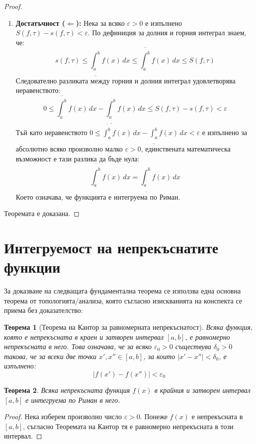 \documentclass{scrartcl}
\newtheorem{theorem}{Теорема}
\begin{document}
\begin{FlushLeft}
\begin{proof}
\begin{enumerate}
    \item \textbf{Достатъчност ($\Leftarrow$):}
    Нека за всяко $\varepsilon > 0$ е изпълнено $S(f, \tau) - s(f, \tau) < \varepsilon$. По дефиниция за долния и горния интеграл знаем, че:
    \[ s(f, \tau) \le \underline{\int_{a}^{b}} f(x)\,dx \le \overline{\int_{a}^{b}} f(x)\,dx \le S(f, \tau) \]
    Следователно разликата между горния и долния интеграл удовлетворява неравенството:
    \[ 0 \le \overline{\int_{a}^{b}} f(x)\,dx - \underline{\int_{a}^{b}} f(x)\,dx \le S(f, \tau) - s(f, \tau) < \varepsilon \]
    Тъй като неравенството $0 \le \overline{\int_{a}^{b}} f(x)\,dx - \underline{\int_{a}^{b}} f(x)\,dx < \varepsilon$ е изпълнено за абсолютно всяко произволно малко $\varepsilon > 0$, единствената математическа възможност е тази разлика да бъде нула:
    \[ \overline{\int_{a}^{b}} f(x)\,dx = \underline{\int_{a}^{b}} f(x)\,dx \]
    Което означава, че функцията е интегруема по Риман.
\end{enumerate}
Теоремата е доказана.
\end{proof}

\newpage

\section{Интегруемост на непрекъснатите функции}

За доказване на следващата фундаментална теорема се използва една основна теорема от топологията/анализа, която съгласно изискванията на конспекта се приема без доказателство:

\begin{theorem}[Теорема на Кантор за равномерната непрекъснатост]
Всяка функция, която е непрекъсната в краен и затворен интервал $[a, b]$, е равномерно непрекъсната в него. Това означава, че за всяко $\varepsilon_0 > 0$ съществува $\delta_0 > 0$ такова, че за всеки две точки $x', x'' \in [a, b]$, за които $|x' - x''| < \delta_0$, е изпълнено:
\[ |f(x') - f(x'')| < \varepsilon_0 \]
\end{theorem}

\begin{theorem}
Всяка непрекъсната функция $f(x)$ в крайния и затворен интервал $[a, b]$ е интегруема по Риман в него.
\end{theorem}

\begin{proof}
Нека изберем произволно число $\varepsilon > 0$. Понеже $f(x)$ е непрекъсната в $[a, b]$, съгласно Теоремата на Кантор тя е равномерно непрекъсната в този интервал.


\end{proof}
\end{FlushLeft}
\end{document}
